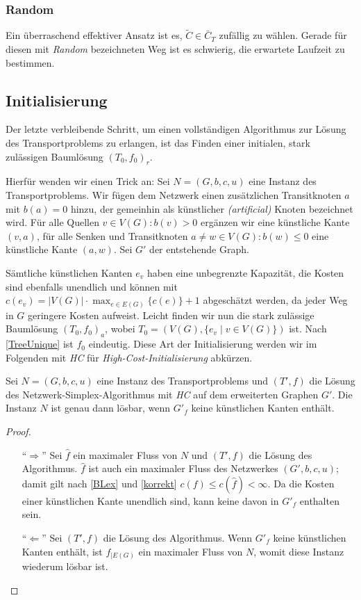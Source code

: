 \subsubsection{Random}
Ein überraschend effektiver Ansatz ist es, $\tilde{C}\in \bar{C}_T$ zufällig zu wählen. Gerade für diesen mit \emph{Random} bezeichneten Weg ist es schwierig, die erwartete Laufzeit zu bestimmen.

\subsection{Initialisierung} \label{ch:init}
Der letzte verbleibende Schritt, um einen vollständigen Algorithmus zur Lösung des Transportproblems zu erlangen, ist das Finden einer initialen, stark zulässigen Baumlösung $(T_0,f_0)_r$.

Hierfür wenden wir einen Trick an: Sei $N=(G,b,c,u)$ eine Instanz des Transportproblems. Wir fügen dem Netzwerk einen zusätzlichen Transitknoten $a$ mit $b(a)=0$ hinzu, der gemeinhin als künstlicher \textit{(artificial)} Knoten bezeichnet wird. Für alle Quellen $v\in V(G)\colon b(v)>0$ ergänzen wir eine künstliche Kante $(v,a)$, für alle Senken und Transitknoten $a\neq w\in V(G)\colon b(w)\leq0$ eine künstliche Kante $(a,w)$. Sei $G'$ der entstehende Graph.

Sämtliche künstlichen Kanten $e_v$ haben eine unbegrenzte Kapazität, die Kosten sind ebenfalls unendlich und können mit $c(e_v)=|V(G)|\cdot\max_{e\in E(G)}\{c(e)\}+1$ abgeschätzt werden, da jeder Weg in $G$ geringere Kosten aufweist. Leicht finden wir nun die stark zulässige Baumlösung $(T_0,f_0)_a$, wobei $T_0=(V(G),\{e_v\mid v\in V(G)\})$ ist. Nach \cref{TreeUnique} ist $f_0$ eindeutig. Diese Art der Initialisierung werden wir im Folgenden mit \emph{HC} für \emph{High-Cost-Initialisierung} abkürzen.

\begin{lem}Sei $N=(G,b,c,u)$ eine Instanz des Transportproblems und $(T',f)$ die Lösung des Netzwerk-Simplex-Algorithmus mit \emph{HC} auf dem erweiterten Graphen $G'$. Die Instanz $N$ ist genau dann lösbar, wenn $G'_f$ keine künstlichen Kanten enthält.\end{lem}
\begin{proof}\label{solvable}\mbox{}
\begin{itemize}[topsep=0pt]
	\item[\enquote{$\Rightarrow$}] Sei $\hat{f}$ ein maximaler Fluss von $N$ und $(T',f)$ die Lösung des Algorithmus. $\hat{f}$ ist auch ein maximaler Fluss des Netzwerkes $(G',b,c,u)$; damit gilt nach \cref{BLex} und \cref{korrekt} $c(f)\leq c(\hat{f})<\infty$. Da die Kosten einer künstlichen Kante unendlich sind, kann keine davon in $G'_f$ enthalten sein.
	
	\item[\enquote{$\Leftarrow$}] Sei $(T',f)$ die Lösung des Algorithmus. Wenn $G'_f$ keine künstlichen Kanten enthält, ist $f_{|E(G)}$ ein maximaler Fluss von $N$, womit diese Instanz wiederum lösbar ist.\qedhere
\end{itemize}
\end{proof}

